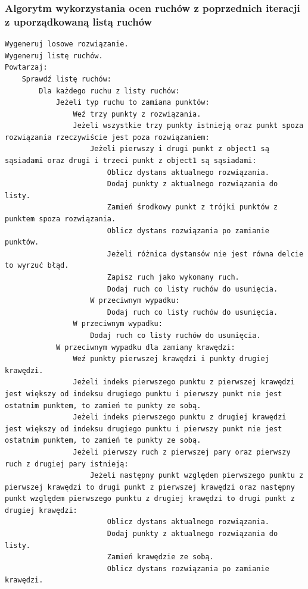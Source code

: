 \documentclass[a4paper]{article}
\begin{document}
\subsubsection{Algorytm wykorzystania ocen ruchów z poprzednich iteracji z uporządkowaną listą ruchów}

\begin{lstlisting}
Wygeneruj losowe rozwiązanie.
Wygeneruj listę ruchów.
Powtarzaj:
    Sprawdź listę ruchów:
        Dla każdego ruchu z listy ruchów:
            Jeżeli typ ruchu to zamiana punktów:
                Weź trzy punkty z rozwiązania.
                Jeżeli wszystkie trzy punkty istnieją oraz punkt spoza rozwiązania rzeczywiście jest poza rozwiązaniem:
                    Jeżeli pierwszy i drugi punkt z object1 są sąsiadami oraz drugi i trzeci punkt z object1 są sąsiadami:
                        Oblicz dystans aktualnego rozwiązania.
                        Dodaj punkty z aktualnego rozwiązania do listy.
                        Zamień środkowy punkt z trójki punktów z punktem spoza rozwiązania.
                        Oblicz dystans rozwiązania po zamianie punktów.
                        Jeżeli różnica dystansów nie jest równa delcie to wyrzuć błąd.
                        Zapisz ruch jako wykonany ruch.
                        Dodaj ruch co listy ruchów do usunięcia.
                    W przeciwnym wypadku:
                        Dodaj ruch co listy ruchów do usunięcia.
                W przeciwnym wypadku:
                    Dodaj ruch co listy ruchów do usunięcia.
            W przeciwnym wypadku dla zamiany krawędzi:
                Weź punkty pierwszej krawędzi i punkty drugiej krawędzi.
                Jeżeli indeks pierwszego punktu z pierwszej krawędzi jest większy od indeksu drugiego punktu i pierwszy punkt nie jest ostatnim punktem, to zamień te punkty ze sobą.
                Jeżeli indeks pierwszego punktu z drugiej krawędzi jest większy od indeksu drugiego punktu i pierwszy punkt nie jest ostatnim punktem, to zamień te punkty ze sobą.
                Jeżeli pierwszy ruch z pierwszej pary oraz pierwszy ruch z drugiej pary istnieją:
                    Jeżeli następny punkt względem pierwszego punktu z pierwszej krawędzi to drugi punkt z pierwszej krawędzi oraz następny punkt względem pierwszego punktu z drugiej krawędzi to drugi punkt z drugiej krawędzi:
                        Oblicz dystans aktualnego rozwiązania.
                        Dodaj punkty z aktualnego rozwiązania do listy.
                        Zamień krawędzie ze sobą.
                        Oblicz dystans rozwiązania po zamianie krawędzi.

\end{lstlisting}
\end{document}
